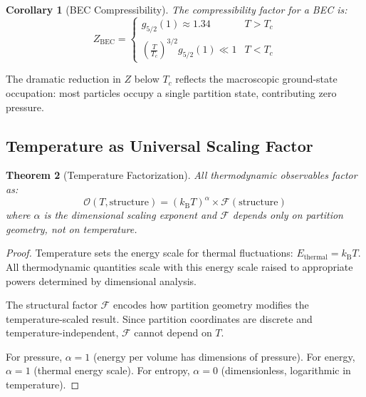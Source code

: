 \documentclass[11pt,twocolumn,a4paper]{article}
\newtheorem{theorem}{Theorem}[section]
\newtheorem{corollary}[theorem]{Corollary}
\theoremstyle{definition}
\theoremstyle{remark}
\newcommand{\kB}{k_{\mathrm{B}}}
\begin{document}
\begin{corollary}[BEC Compressibility]
\label{cor:bec_compressibility}
The compressibility factor for a BEC is:
\begin{equation}
Z_{\mathrm{BEC}} = \begin{cases}
g_{5/2}(1) \approx 1.34 & T > T_c \\[5pt]
\displaystyle \left(\frac{T}{T_c}\right)^{3/2} g_{5/2}(1) \ll 1 & T < T_c
\end{cases}
\label{eq:bec_compressibility}
\end{equation}
\end{corollary}

The dramatic reduction in $Z$ below $T_c$ reflects the macroscopic ground-state occupation: most particles occupy a single partition state, contributing zero pressure.

\subsection{Temperature as Universal Scaling Factor}

\begin{theorem}[Temperature Factorization]
\label{thm:temperature_factorization}
All thermodynamic observables factor as:
\begin{equation}
\mathcal{O}(T, \text{structure}) = (\kB T)^{\alpha} \times \mathcal{F}(\text{structure})
\label{eq:temperature_factorization}
\end{equation}
where $\alpha$ is the dimensional scaling exponent and $\mathcal{F}$ depends only on partition geometry, not on temperature.
\end{theorem}

\begin{proof}
Temperature sets the energy scale for thermal fluctuations: $E_{\mathrm{thermal}} = \kB T$. All thermodynamic quantities scale with this energy scale raised to appropriate powers determined by dimensional analysis.

The structural factor $\mathcal{F}$ encodes how partition geometry modifies the temperature-scaled result. Since partition coordinates are discrete and temperature-independent, $\mathcal{F}$ cannot depend on $T$.

For pressure, $\alpha = 1$ (energy per volume has dimensions of pressure). For energy, $\alpha = 1$ (thermal energy scale). For entropy, $\alpha = 0$ (dimensionless, logarithmic in temperature).
\end{proof}
\end{document}
